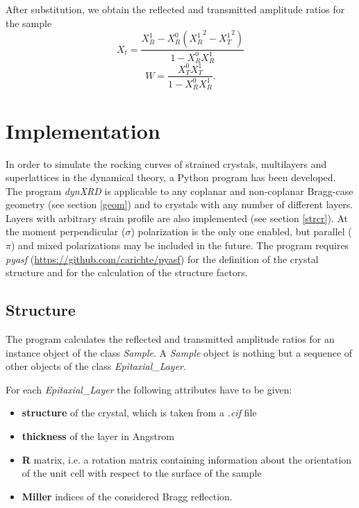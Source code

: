 \documentclass[12pt,oneside,notitlepage,abstracton,a4paper]{scrartcl}
\begin{document}
After substitution, we obtain the reflected and transmitted amplitude ratios for the sample
\begin{equation}\label{refl}
 X_t=\frac{X_R^1-X_R^0({X_R^1}^2-{X_T^1}^2)}{1-X_R^0 X_R^1}
\end{equation}
\begin{equation}\label{trans}
 W=\frac{X_T^0 X_T^1}{1-X_R^0 X_R^1}.
\end{equation}





\section{Implementation}

In order to simulate the rocking curves of strained crystals, multilayers and superlattices in the dynamical theory, a Python program has been developed. The program \textit{dynXRD} is applicable to any coplanar and non-coplanar Bragg-case geometry (see section \ref{geom}) and to crystals with any number of different layers. Layers with arbitrary strain profile are also implemented (see section \ref{strcr}). At the moment perpendicular ($\sigma$) polarization is the only one enabled, but parallel ($\pi$) and mixed polarizations may be included in the future. The program requires \textit{pyasf} (\url{https://github.com/carichte/pyasf}) for the definition of the crystal structure and for the calculation of the structure factors.


\subsection{Structure}
The program calculates the reflected and transmitted amplitude ratios for an instance object of the class \textit{Sample}. A \textit{Sample} object is nothing but a sequence of other objects of the class \textit{Epitaxial\_Layer}.

For each \textit{Epitaxial\_Layer} the following attributes have to be given:
\begin{itemize}
 \item \textbf{structure} of the crystal, which is taken from a \textit{.cif} file
 \item \textbf{thickness} of the layer in Angstrom
 \item \textbf{R} matrix, i.e. a rotation matrix containing information about the orientation of the unit cell with respect to the surface of the sample
 \item \textbf{Miller} indices of the considered Bragg reflection.
\end{itemize}
\end{document}
